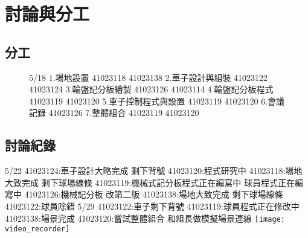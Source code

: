 \chapter{討論與分工}
\renewcommand{\baselinestretch}{10.0} %
\setcounter{page}{1}  %
\fontsize{14pt}{2.5pt}\sectionef
\section{分工}
\begin{figure}
\begin{center}
5/18
1.場地設置 41023118 41023138
2.車子設計與組裝 41023122 41023124
3.輪盤記分板繪製 41023126 41023114
4.輪盤記分板程式 41023119 41023120
5.車子控制程式與設置 41023119 41023120
6.會議記錄 41023126
7.整體組合 41023119 41023120
\end{center}
\end{figure}

\section{討論紀錄}
\begin{enumerate}
5/22 
41023124:車子設計大略完成 剩下背號
41023120:程式研究中
41023118:場地大致完成 剩下球場線條
41023119:機械式記分板程式正在編寫中 球員程式正在編寫中
41023126:機械記分板 改第二版
41023138:場地大致完成 剩下球場線條
41023122:球員除錯
5/29
41023122:車子剩下背號
41023119:球員程式正在修改中
41023138:場景完成
41023120:嘗試整體組合
和組長做模擬場景連線
\texttt{[image: video\_recorder]}
\end{enumerate}
\renewcommand{\baselinestretch}{0.5} %